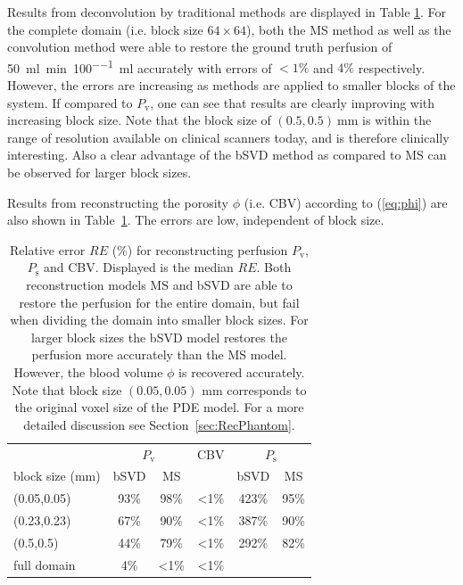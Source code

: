 \documentclass[journal,twocolumn]{IEEEtran}
\newcommand{\Perfv}{P_{\mathrm{v}}}
\newcommand{\Perfs}{P_{\mathrm{s}}}
\newcommand{\siPml}{\milli\litre\per\minute\per100\milli\litre}
\begin{document}
	Results from deconvolution by traditional methods are displayed in Table \ref{tab:resultsSim}. 
	For the complete domain (i.e. block size $64 \times 64$), both the MS method as well as the convolution method were able to restore the ground truth perfusion of \SI{50}{\siPml} accurately with errors of $<1\%$ and $4\%$ respectively.
	However, the errors are increasing as methods are applied to smaller blocks of the system.
	If compared to $\Perfv$, one can see that results are clearly improving with increasing block size. Note that the block size of $(0.5,0.5)\SI{}{\milli\meter}$ is within the range of resolution available on clinical scanners today, and is therefore clinically interesting.
	Also a clear advantage of the bSVD method as compared to MS can be observed for larger block sizes.
		
	Results from reconstructing the porosity $\phi$ (i.e. CBV) according to (\ref{eq:phi}) are also shown in Table~\ref{tab:resultsSim}. The errors are low, independent of block size.
	
	\begin{table}[h!tb]
		\scriptsize
		\caption{Relative error $RE$ (\%) for reconstructing perfusion $\Perfv$, $\Perfs$ and CBV. Displayed is the median $RE$. Both reconstruction models MS and bSVD are able to restore the perfusion for the entire domain, but fail when dividing the domain into smaller block sizes. For larger block sizes the bSVD model restores the perfusion more accurately than the MS model. However, the blood volume $\phi$ is recovered accurately. Note that block size $(0.05,0.05)$ mm corresponds to the original voxel size of the PDE model. For a more detailed discussion see Section~\ref{sec:RecPhantom}.}
		\centering
		\begin{tabular}{p{2cm} c c c c c}
						& \multicolumn{2}{c}{$\Perfv$} & CBV & \multicolumn{2}{c}{$\Perfs$}  \\
			block size (mm)	& bSVD	& MS 	&  		& bSVD	& MS 	\\ \toprule
			(0.05,0.05) 		& 93\%	& 98\%  & <1\%  & 423\%	& 95\% 	\\
			(0.23,0.23) 		& 67\%	& 90\% 	& <1\% 	& 387\%	& 90\% 	\\
			(0.5,0.5) 	& 44\%	& 79\% 	& <1\% 	& 292\%	& 82\% 	\\
			full domain   	& 4\%	& <1\%  & <1\%	& 		& 	   
		\end{tabular}
		\label{tab:resultsSim}
	\end{table}
	
\end{document}
